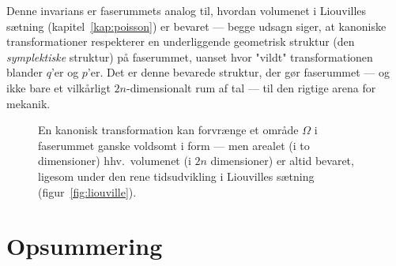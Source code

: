 \begin{bemaerkning}
Denne invarians er faserummets analog til, hvordan volumenet i
Liouvilles sætning (kapitel~\ref{kap:poisson}) er bevaret — begge
udsagn siger, at kanoniske transformationer respekterer en underliggende
geometrisk struktur (den \emph{symplektiske} struktur) på faserummet,
uanset hvor "vildt" transformationen blander $q$'er og $p$'er. Det er
denne bevarede struktur, der gør faserummet — og ikke bare et vilkårligt
$2n$-dimensionalt rum af tal — til den rigtige arena for mekanik.
\end{bemaerkning}

\begin{figure}[htbp]
  \centering
  \caption{En kanonisk transformation kan forvrænge et område $\Omega$ i
  faserummet ganske voldsomt i form — men arealet (i to dimensioner)
  hhv.\ volumenet (i $2n$ dimensioner) er altid bevaret, ligesom under
  den rene tidsudvikling i Liouvilles sætning
  (figur~\ref{fig:liouville}).}
  \label{fig:kanonisk-transf}
\end{figure}

\section{Opsummering}

